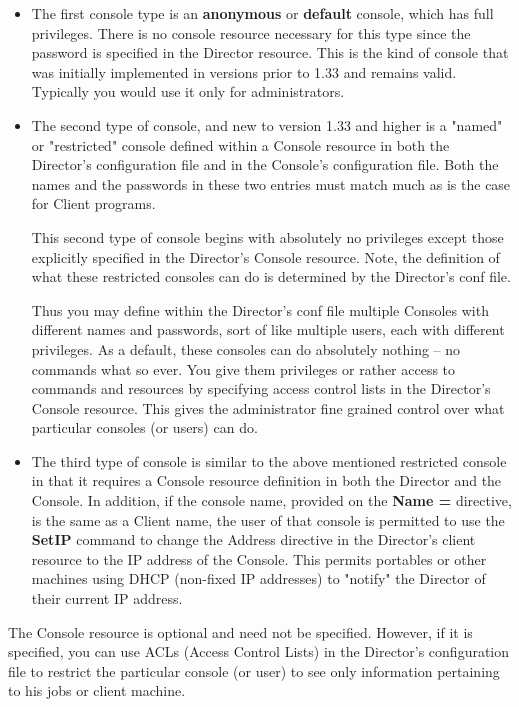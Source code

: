 \begin{itemize}
\item The first console type is an {\bf anonymous} or {\bf default}  console,
   which has full privileges. There is no console  resource necessary for this
   type since the password is  specified in the Director resource. This is the
   kind of  console that was initially implemented in versions prior to  1.33 and
   remains valid. Typically you would use it only for administrators.  

\item The second type of console, and new to version 1.33 and higher is a
   "named" or "restricted" console defined within a Console resource in
   both the Director's configuration file and in the Console's
   configuration file.  Both the names and the passwords in these two
   entries must match much as is the case for Client programs.

   This second type of console begins with absolutely no privileges except
   those explicitly specified in the Director's Console resource.  Note,
   the definition of what these restricted consoles can do is determined 
   by the Director's conf file.

   Thus you may define within the Director's conf file multiple Consoles
   with different names and passwords, sort of like multiple users, each
   with different privileges.  As a default, these consoles can do
   absolutely nothing -- no commands what so ever.  You give them
   privileges or rather access to commands and resources by specifying
   access control lists in the Director's Console resource.  This gives the
   administrator fine grained control over what particular consoles (or
   users) can do.

\item The third type of console is similar to the above mentioned
   restricted console in that it requires a Console resource definition in
   both the Director and the Console.  In addition, if the console name,
   provided on the {\bf Name =} directive, is the same as a Client name,
   the user of that console is permitted to use the {\bf SetIP} command to
   change the Address directive in the Director's client resource to the IP
   address of the Console.  This permits portables or other machines using
   DHCP (non-fixed IP addresses) to "notify" the Director of their current
   IP address.

\end{itemize}

The Console resource is optional and need not be specified. However, if it is
specified, you can use ACLs (Access Control Lists) in the Director's
configuration file to restrict the particular console (or user) to see only
information pertaining to his jobs or client machine. 

